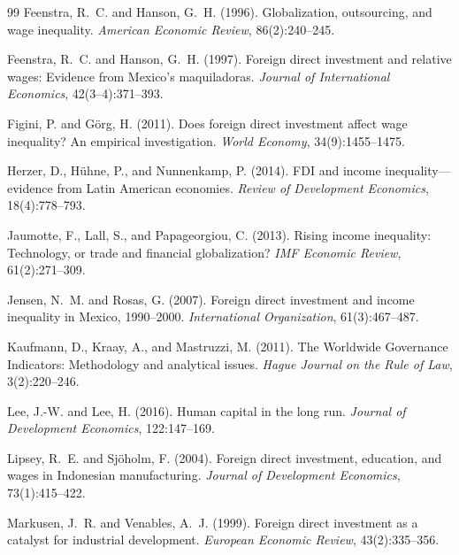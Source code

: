 \documentclass[12pt,a4paper]{article}
\begin{document}
\begin{thebibliography}{99}
Feenstra, R.~C. and Hanson, G.~H. (1996).
\newblock Globalization, outsourcing, and wage inequality.
\newblock \textit{American Economic Review}, 86(2):240--245.

Feenstra, R.~C. and Hanson, G.~H. (1997).
\newblock Foreign direct investment and relative wages: Evidence from Mexico's maquiladoras.
\newblock \textit{Journal of International Economics}, 42(3--4):371--393.

Figini, P. and G\"org, H. (2011).
\newblock Does foreign direct investment affect wage inequality? An empirical investigation.
\newblock \textit{World Economy}, 34(9):1455--1475.

Herzer, D., Hühne, P., and Nunnenkamp, P. (2014).
\newblock FDI and income inequality---evidence from Latin American economies.
\newblock \textit{Review of Development Economics}, 18(4):778--793.

Jaumotte, F., Lall, S., and Papageorgiou, C. (2013).
\newblock Rising income inequality: Technology, or trade and financial globalization?
\newblock \textit{IMF Economic Review}, 61(2):271--309.

Jensen, N.~M. and Rosas, G. (2007).
\newblock Foreign direct investment and income inequality in Mexico, 1990--2000.
\newblock \textit{International Organization}, 61(3):467--487.

Kaufmann, D., Kraay, A., and Mastruzzi, M. (2011).
\newblock The Worldwide Governance Indicators: Methodology and analytical issues.
\newblock \textit{Hague Journal on the Rule of Law}, 3(2):220--246.

Lee, J.-W. and Lee, H. (2016).
\newblock Human capital in the long run.
\newblock \textit{Journal of Development Economics}, 122:147--169.

Lipsey, R.~E. and Sj\"oholm, F. (2004).
\newblock Foreign direct investment, education, and wages in Indonesian manufacturing.
\newblock \textit{Journal of Development Economics}, 73(1):415--422.

Markusen, J.~R. and Venables, A.~J. (1999).
\newblock Foreign direct investment as a catalyst for industrial development.
\newblock \textit{European Economic Review}, 43(2):335--356.


\end{thebibliography}
\end{document}
